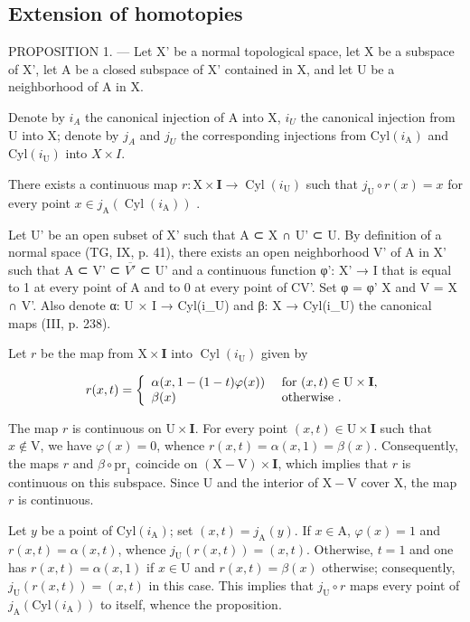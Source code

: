 \subsection{Extension of homotopies}

PROPOSITION 1. --- Let X' be a normal topological space, let X be a subspace of X', let A be a closed subspace of X' contained in X, and let U be a neighborhood of A in X.

Denote by \(i_{A}\) the canonical injection of A into X, \(i_{U}\) the canonical injection from U into X; denote by \(j_{A}\) and \(j_{U}\) the corresponding injections from \(\mathrm{Cyl}(i_{\mathrm{A}})\) and \(\mathrm{Cyl}(i_{\mathrm{U}})\) into \(X \times I\).

There exists a continuous map \(r \colon \mathrm{X} \times \mathbf{I} \to \operatorname{Cyl}(i_{\mathrm{U}})\) such that \(j_{\mathrm{U}} \circ r(x) = x\) for every point \(x \in j_{\mathrm{A}}(\operatorname{Cyl}(i_{\mathrm{A}}))\) .

Let U' be an open subset of X' such that A ⊂ X ∩ U' ⊂ U. By definition of a normal space (TG, IX, p. 41), there exists an open neighborhood V' of A in X' such that A ⊂ V' ⊂ \(\overline{V'}\) ⊂ U' and a continuous function φ': X' → I that is equal to 1 at every point of A and to 0 at every point of CV'. Set φ = φ' \textbar{} X and V = X ∩ V'. Also denote α: U × I → Cyl(i\_U) and β: X → Cyl(i\_U) the canonical maps (III, p. 238).

Let \(r\) be the map from \(\mathrm{X} \times \mathbf{I}\) into \(\operatorname{Cyl}(i_{\mathrm{U}})\) given by

\[
r (x, t) = \left\{ \begin{array}{l l} \alpha (x, 1 - (1 - t) \varphi (x)) & \text { for } (x, t) \in \mathrm{U} \times \mathbf {I}, \\ \beta (x) & \text { otherwise }. \end{array} \right.
\]

The map \(r\) is continuous on \(\mathrm{U} \times \mathbf{I}\). For every point \((x, t) \in \mathrm{U} \times \mathbf{I}\) such that \(x \notin \mathrm{V}\), we have \(\varphi(x) = 0\), whence \(r(x, t) = \alpha(x, 1) = \beta(x)\). Consequently, the maps \(r\) and \(\beta \circ \mathrm{pr}_1\) coincide on \((\mathrm{X} - \mathrm{V}) \times \mathbf{I}\), which implies that \(r\) is continuous on this subspace. Since U and the interior of \(\mathrm{X} - \mathrm{V}\) cover X, the map \(r\) is continuous.

Let \(y\) be a point of \(\mathrm{Cyl}(i_{\mathrm{A}})\); set \((x,t) = j_{\mathrm{A}}(y)\). If \(x \in \mathrm{A}\), \(\varphi(x) = 1\) and \(r(x,t) = \alpha(x,t)\), whence \(j_{\mathrm{U}}(r(x,t)) = (x,t)\). Otherwise, \(t = 1\) and one has \(r(x,t) = \alpha(x,1)\) if \(x \in \mathrm{U}\) and \(r(x,t) = \beta(x)\) otherwise; consequently, \(j_{\mathrm{U}}(r(x,t)) = (x,t)\) in this case. This implies that \(j_{\mathrm{U}} \circ r\) maps every point of \(j_{\mathrm{A}}(\mathrm{Cyl}(i_{\mathrm{A}}))\) to itself, whence the proposition.

